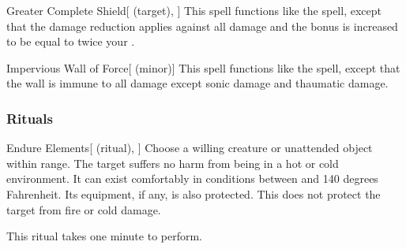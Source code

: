 \lowercase{\hypertarget{spell:Greater Complete Shield}{}}\label{spell:Greater Complete Shield}
\begin{attuneability}[\nth{5}]{\hypertarget{spell:Greater Complete Shield}{Greater Complete Shield}}[ (target), ]
This spell functions like the  spell, except that the damage reduction applies against all damage and the bonus is increased to be equal to twice your .
\end{attuneability}
\vspace{0.25em}



\lowercase{\hypertarget{spell:Impervious Wall of Force}{}}\label{spell:Impervious Wall of Force}
\begin{freeability}[\nth{5}]{\hypertarget{spell:Impervious Wall of Force}{Impervious Wall of Force}}[ (minor)]
This spell functions like the  spell, except that the wall is immune to all damage except sonic damage and thaumatic damage.
\end{freeability}
\vspace{0.25em}



\subsubsection{Rituals}


\lowercase{\hypertarget{spell:Endure Elements}{}}\label{spell:Endure Elements}
\begin{attuneability}[\nth{1}]{\hypertarget{spell:Endure Elements}{Endure Elements}}[ (ritual), ]
Choose a willing creature or unattended object within \rngclose range.
The target suffers no harm from being in a hot or cold environment.
It can exist comfortably in conditions between  and 140 degrees Fahrenheit.
Its equipment, if any, is also protected.
This does not protect the target from fire or cold damage.

This ritual takes one minute to perform.
\end{attuneability}
\vspace{0.25em}



